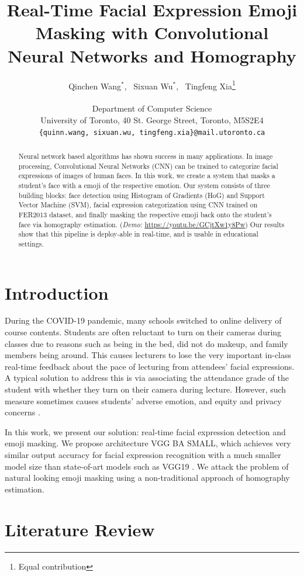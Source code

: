 \documentclass{article}
\title{Real-Time Facial Expression Emoji Masking with Convolutional Neural Networks and Homography}
\author{%
  Qinchen Wang$^*$,~ Sixuan Wu$^*$,~ Tingfeng Xia\thanks{Equal contribution} \\\\
  Department of Computer Science \\
  University of Toronto, 40 St. George Street, Toronto, M5S2E4 \\
  \texttt{\{quinn.wang, sixuan.wu, tingfeng.xia\}@mail.utoronto.ca} \\
}
\begin{document}
\maketitle
\begin{abstract}
    Neural network based algorithms has shown success in many applications. In image processing, Convolutional Neural Networks (CNN) can be trained to categorize facial expressions of images of human faces. In this work, we create a system that masks a student's face with a emoji of the respective emotion. Our system consists of three building blocks: face detection using Histogram of Gradients (HoG) and Support Vector Machine (SVM), facial expression categorization using CNN trained on FER2013 dataset, and finally masking the respective emoji back onto the student's face via homography estimation. (\textit{Demo:} \url{https://youtu.be/GCjtXw1y8Pw}) Our results show that this pipeline is deploy-able in real-time, and is usable in educational settings. 
\end{abstract}
\section{Introduction}
During the COVID-19 pandemic, many schools switched to online delivery of course contents. Students are often reluctant to turn on their cameras during classes due to reasons such as being in the bed, did not do makeup, and family members being around. This causes lecturers to lose the very important in-class real-time feedback about the pace of lecturing from attendees’ facial expressions. A typical solution to address this is via associating the attendance grade of the student with whether they turn on their camera during lecture. However, such measure sometimes causes students' adverse emotion, and equity and privacy concerns \cite{barnett, nicardo_khandelwal_weitzman_2020, will_2020}.

In this work, we present our solution: real-time facial expression detection and emoji masking. We propose architecture VGG BA SMALL, which achieves very similar output accuracy for facial expression recognition with a much smaller model size than state-of-art models such as VGG19 \cite{simonyan_zisserman_2014}. We attack the problem of natural looking emoji masking using a non-traditional approach of homography estimation.  


\section{Literature Review}
\end{document}
